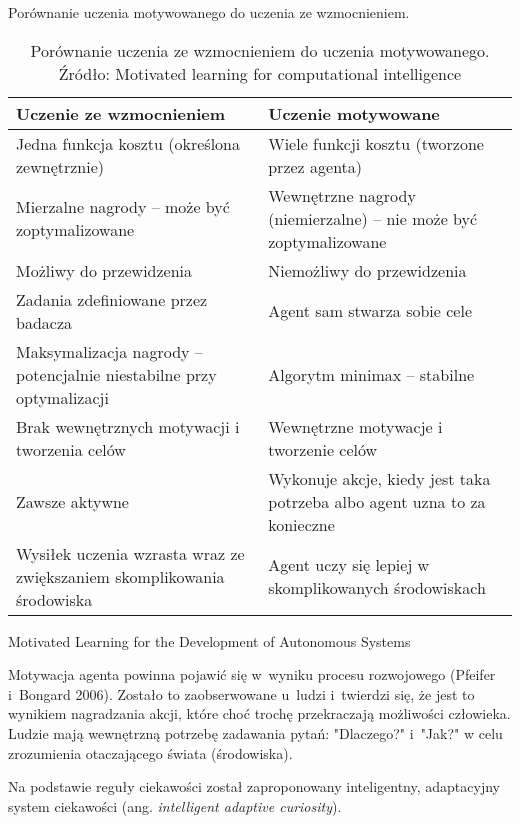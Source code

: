 Porównanie uczenia motywowanego do uczenia ze wzmocnieniem.
\begin{table}[H]
\centering
\caption{Porównanie uczenia ze wzmocnieniem do uczenia motywowanego. 
Źródło: Motivated learning for computational intelligence}
\begin{tabular}{|p{}|p{}|}
    \hline
    \textbf{Uczenie ze wzmocnieniem} & \textbf{Uczenie motywowane} \\
    \hline
    Jedna funkcja kosztu (określona zewnętrznie) & Wiele funkcji kosztu 
    (tworzone przez agenta) \\
    \hline
    Mierzalne nagrody -- może być zoptymalizowane & Wewnętrzne nagrody 
    (niemierzalne) -- nie może być zoptymalizowane \\
    \hline
    Możliwy do przewidzenia & Niemożliwy do przewidzenia \\
    \hline
    Zadania zdefiniowane przez badacza & Agent sam stwarza sobie cele \\
    \hline
    Maksymalizacja nagrody -- potencjalnie niestabilne przy optymalizacji & 
    Algorytm minimax -- stabilne \\
    \hline
    Brak wewnętrznych motywacji i tworzenia celów & Wewnętrzne motywacje 
    i tworzenie celów \\
    \hline
    Zawsze aktywne & Wykonuje akcje, kiedy jest taka potrzeba albo agent uzna 
    to za konieczne \\
    \hline
    Wysiłek uczenia wzrasta wraz ze zwiększaniem skomplikowania środowiska & 
    Agent uczy się lepiej w skomplikowanych środowiskach \\
    \hline
\end{tabular}
\end{table}

Motivated Learning for the Development of Autonomous Systems

Motywacja agenta powinna pojawić się w~wyniku procesu rozwojowego (Pfeifer 
i~Bongard 2006). Zostało to zaobserwowane u~ludzi i~twierdzi się, że jest to 
wynikiem nagradzania akcji, które choć trochę przekraczają możliwości człowieka. 
Ludzie mają wewnętrzną potrzebę zadawania pytań: "Dlaczego?" i~"Jak?" w celu 
zrozumienia otaczającego świata (środowiska).

Na podstawie reguły ciekawości został zaproponowany inteligentny, adaptacyjny 
system ciekawości (ang. \textit{intelligent adaptive curiosity}).
